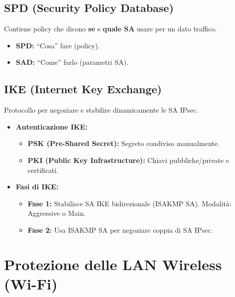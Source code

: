 \subsection{SPD (Security Policy Database)}
Contiene policy che dicono \textbf{se} e \textbf{quale SA} usare per un dato traffico.
\begin{itemize}
    \item \textbf{SPD:} \textquotedblleft Cosa\textquotedblright{} fare (policy).
    \item \textbf{SAD:} \textquotedblleft Come\textquotedblright{} farlo (parametri SA).
\end{itemize}

\subsection{IKE (Internet Key Exchange)}
Protocollo per negoziare e stabilire dinamicamente le SA IPsec.
\begin{itemize}
    \item \textbf{Autenticazione IKE:}
    \begin{itemize}
        \item \textbf{PSK (Pre-Shared Secret):} Segreto condiviso manualmente.
        \item \textbf{PKI (Public Key Infrastructure):} Chiavi pubbliche/private e certificati.
    \end{itemize}
    \item \textbf{Fasi di IKE:}
    \begin{itemize}
        \item \textbf{Fase 1:} Stabilisce SA IKE bidirezionale (ISAKMP SA). Modalità: Aggressive o Main.
        \item \textbf{Fase 2:} Usa ISAKMP SA per negoziare coppia di SA IPsec.
    \end{itemize}
\end{itemize}

\section{Protezione delle LAN Wireless (Wi-Fi)}
\label{sec:wifi_security}

